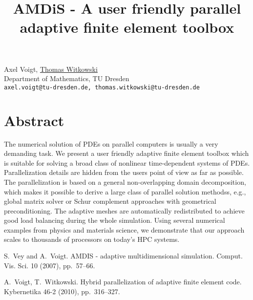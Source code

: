 \title{AMDiS - A user friendly parallel adaptive finite element toolbox}
\author{} \institute{}
\maketitle

\begin{center}
{\large Axel Voigt, \underline{Thomas Witkowski}}\\
Department of Mathematics, TU Dresden\\
{\tt axel.voigt@tu-dresden.de, thomas.witkowski@tu-dresden.de}
\end{center}

\section*{Abstract}
The numerical solution of PDEs on parallel computers is usually a very demanding task. We present a user friendly adaptive finite element toolbox which is suitable for solving a broad class of nonlinear time-dependent systems of PDEs. Parallelization details are hidden from the users point of view as far as possible. The parallelization is based on a general non-overlapping domain decomposition, which makes it possible to derive a large class of parallel solution methodss, e.g., global matrix solver or Schur complement approaches with geometrical preconditioning. The adaptive meshes are automatically redistributed to achieve good load balancing during the whole simulation.  Using several numerical examples from physics and materials science, we demonstrate that our approach scales to thousands of processors on today's HPC systems.


\begin{thebibliography}{10}
{S.~Vey and A.~Voigt}. {AMDIS - adaptive multidimensional simulation}. Comput. Vis. Sci. 10 (2007), pp.~57--66.

{A.~Voigt, T.~Witkowski}. {Hybrid parallelization of adaptive finite element code}. Kybernetika 46-2 (2010), pp.~316--327.
\end{thebibliography}